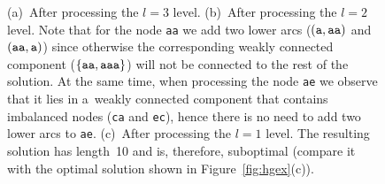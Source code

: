 \begin{figure}[!ht]
\begin{mypic}


\end{mypic}
\caption{(a)~After processing the $l=3$ level. (b)~After processing the $l=2$ level. Note that for the node {\tt aa} we add two lower arcs ($({\tt a}, {\tt aa})$ and $({\tt aa}, {\tt a})$) since otherwise the corresponding weakly connected component ($\{{\tt aa}, {\tt aaa}\}$) will not be connected to the rest of the solution. At the same time, when processing the node {\tt ae} we observe that it lies in a~weakly connected component that contains imbalanced nodes ({\tt ca} and {\tt ec}), hence there is no need to add two lower arcs to {\tt ae}. (c)~After processing the $l=1$ level. The resulting solution has length~10 and is, therefore, suboptimal (compare it with the optimal solution shown in Figure~\ref{fig:hgex}(c)).}
\label{fig:hgexa}
\end{figure}






